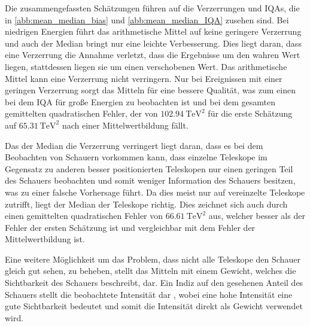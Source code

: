 Die zusammengefassten Schätzungen führen auf die Verzerrungen und IQAs, die in \autoref{abb:mean_median_bias} und \autoref{abb:mean_median_IQA} zusehen sind.
Bei niedrigen Energien führt das arithmetische Mittel auf keine geringere Verzerrung und auch der Median bringt nur eine leichte Verbesserung.
Dies liegt daran, dass eine Verzerrung die Annahme verletzt, dass die Ergebnisse um den wahren Wert liegen, stattdessen liegen sie um einen verschobenen
Wert.
Das arithmetische Mittel kann eine Verzerrung nicht verringern.
Nur bei Ereignissen mit einer geringen Verzerrung sorgt das Mitteln für eine bessere Qualität, was zum einen bei dem IQA für große Energien zu beobachten
ist und bei dem gesamten gemittelten quadratischen Fehler, der von $\SI{102.94}{\tera\eV\squared}$ für die erste Schätzung auf $\SI{65.31}{\tera\eV\squared}$ nach einer
Mittelwertbildung fällt.

Das der Median die Verzerrung verringert liegt daran, dass es bei dem Beobachten von Schauern vorkommen kann, dass einzelne Teleskope im Gegensatz zu anderen
besser positionierten Teleskopen nur einen geringen Teil des Schauers beobachten und somit weniger Information des Schauers besitzen, was zu einer falsche Vorhersage
führt.
Da dies meist nur auf vereinzelte Teleskope zutrifft, liegt der Median der Teleskope richtig.
Dies zeichnet sich auch durch einen gemittelten quadratischen Fehler von $\SI{66.61}{\tera\eV\squared}$ aus, welcher besser als der Fehler der ersten Schätzung ist und
vergleichbar mit dem Fehler der Mittelwertbildung ist.

Eine weitere Möglichkeit um das Problem, dass nicht alle Teleskope den Schauer gleich gut sehen, zu beheben, stellt das Mitteln mit einem Gewicht, welches die
Sichtbarkeit des Schauers beschreibt, dar.
Ein Indiz auf den gesehenen Anteil des Schauers stellt die beobachtete Intensität dar , wobei eine hohe
Intensität eine gute Sichtbarkeit bedeutet und somit die Intensität direkt als Gewicht verwendet wird.

